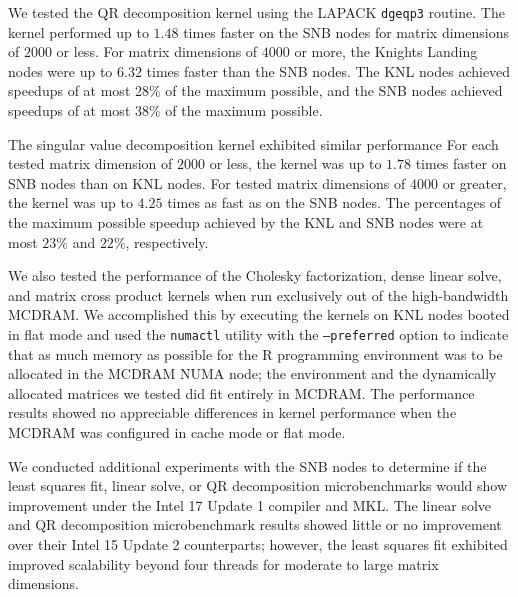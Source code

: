 We tested the QR decomposition kernel using the LAPACK \texttt{dgeqp3}
  routine.
The kernel performed up to $1.48$ times faster on the SNB nodes for
  matrix dimensions of $2000$ or less.
For matrix dimensions of $4000$ or more, the Knights Landing nodes were up to
  $6.32$ times faster than the SNB nodes.
The KNL nodes achieved speedups of at most $28\%$ of the maximum possible, and
  the SNB nodes achieved speedups of at most $38\%$ of the maximum possible.

The singular value decomposition kernel exhibited similar performance
For each tested matrix dimension of $2000$ or less, the kernel was
  up to $1.78$ times faster on SNB nodes than on KNL nodes.
For tested matrix dimensions of $4000$ or greater, the kernel was up to $4.25$
  times as fast as on the SNB nodes.
The percentages of the maximum possible speedup achieved by the KNL
  and SNB nodes were at most $23\%$ and $22\%$, respectively.

We also tested the performance of the Cholesky factorization, dense linear
  solve, and matrix cross product kernels when run exclusively out of the
  high-bandwidth MCDRAM.
We accomplished this by executing the kernels on KNL nodes booted in
  flat mode and used the \texttt{numactl} utility with the \texttt{--preferred}
  option to indicate that as much memory as possible for the R programming
  environment was to be allocated in the MCDRAM NUMA node; the environment and
  the dynamically allocated matrices we tested did fit entirely in MCDRAM.
The performance results showed no appreciable differences
  in kernel performance when the MCDRAM was configured in cache mode or flat
  mode.

We conducted additional experiments with the SNB nodes to determine if
  the least squares fit, linear solve, or QR decomposition microbenchmarks
  would show improvement under the Intel 17 Update 1 compiler and MKL.
The linear solve and QR decomposition microbenchmark results showed little
  or no improvement over their Intel 15 Update 2 counterparts; however, the
  least squares fit exhibited improved scalability beyond four threads
  for moderate to large matrix dimensions.

